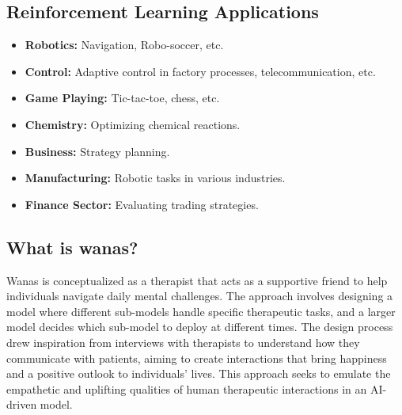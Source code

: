 \subsection*{Reinforcement Learning Applications}
\begin{itemize}
    \item \textbf{Robotics:} Navigation, Robo-soccer, etc.
    \item \textbf{Control:} Adaptive control in factory processes, telecommunication, etc.
    \item \textbf{Game Playing:} Tic-tac-toe, chess, etc.
    \item \textbf{Chemistry:} Optimizing chemical reactions.
    \item \textbf{Business:} Strategy planning.
    \item \textbf{Manufacturing:} Robotic tasks in various industries.
    \item \textbf{Finance Sector:} Evaluating trading strategies.
\end{itemize}


\subsection{What is wanas?}
Wanas is conceptualized as a therapist that acts as a supportive friend to help individuals navigate daily mental challenges. The approach involves designing a model where different sub-models handle specific therapeutic tasks, and a larger model decides which sub-model to deploy at different times. The design process drew inspiration from interviews with therapists to understand how they communicate with patients, aiming to create interactions that bring happiness and a positive outlook to individuals' lives. This approach seeks to emulate the empathetic and uplifting qualities of human therapeutic interactions in an AI-driven model.


